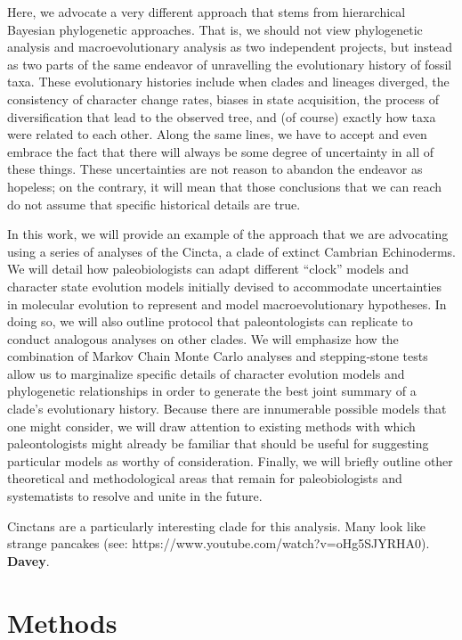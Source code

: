 \documentclass{article}
\begin{document}
Here, we advocate a very different approach that stems from hierarchical Bayesian phylogenetic approaches.  
That is, we should not view phylogenetic analysis and macroevolutionary analysis as two independent projects, but instead as two parts of the same endeavor of unravelling the evolutionary history of fossil taxa.  
These evolutionary histories include when clades and lineages diverged, the consistency of character change rates, biases in state acquisition, the process of diversification that lead to the observed tree, and (of course) exactly how taxa were related to each other.  
Along the same lines, we have to accept and even embrace the fact that there will always be some degree of uncertainty in all of these things.  
These uncertainties are not reason to abandon the endeavor as hopeless; on the contrary, it will mean that those conclusions that we can reach do not assume that specific historical details are true.  

In this work, we will provide an example of the approach that we are advocating using a series of analyses of the Cincta, a clade of extinct Cambrian Echinoderms. 
We will detail how paleobiologists can adapt different “clock” models and character state evolution models initially devised to accommodate uncertainties in molecular evolution to represent and model macroevolutionary hypotheses.  
In doing so, we will also outline protocol that paleontologists can replicate to conduct analogous analyses on other clades.  
We will emphasize how the combination of Markov Chain Monte Carlo analyses and stepping‑stone tests allow us to marginalize specific details of character evolution models and phylogenetic relationships in order to generate the best joint summary of a clade’s evolutionary history.  
Because there are innumerable possible models that one might consider, we will draw attention to existing methods with which paleontologists might already be familiar that should be useful for suggesting particular models as worthy of consideration.  
Finally, we will briefly outline other theoretical and methodological areas that remain for paleobiologists and systematists to resolve and unite in the future. 

Cinctans are a particularly interesting clade for this analysis.
Many look like strange pancakes (see: https://www.youtube.com/watch?v=oHg5SJYRHA0).
\textbf{Davey}.

\section{Methods}
\end{document}

